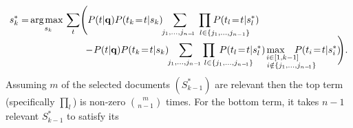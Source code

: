 \begin{align}
s_k^* =  & \, \argmax_{s_k} \sum_t \Biggl( P(t|\vec{q}) P(t_k\!=\!t|s_k)  \sum_{\hspace{-1mm} j_1, \dots, j_{n-\!1}} \hspace{-13.5mm} \prod_{\hspace{14.5mm} l \in \{j_1, \dots, j_{n-1}\}} \hspace{-14mm} P(t_l\!=\!t|s_l^*) \nonumber \\[-2mm]
  & \hspace{20mm} - \!P(t|\vec{q}) P(t_k\!=\!t|s_k) \sum_{\hspace{-1mm} j_1, \dots, j_{n-\!1}} \hspace{-14mm} \prod_{\hspace{14.5mm} l \in \{j_1, \dots, j_{n-\!1}\}} \hspace{-13mm} P(t_l\!=\!t|s_l^*) \hspace{-11.5mm} \max_{\substack{\hspace{5mm} i \in [1,k-1] \\ \hspace{11.5mm} i \notin \{j_1, \dots, j_{n-\!1}\}}} \hspace{-8.5mm} P(t_i\!=\!t|s_i^*) \!\!\Biggr) . \nonumber %
\end{align}
Assuming $m$ of the selected documents $(S_{k-1}^*)$ are relevant 
then the top term
(specifically $\prod_l$) is non-zero $\binom{m}{n-1}$ times.  For the
bottom term, it takes $n-1$ relevant $S_{k-1}^*$ to satisfy its
